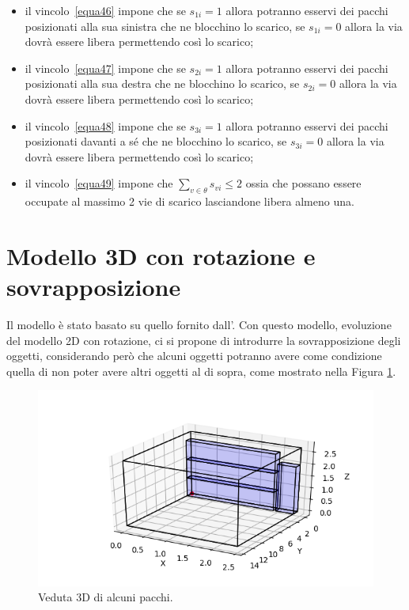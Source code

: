 \begin{itemize}
	\item il vincolo~\eqref{equa46} impone che se $s_{1i} = 1$ allora potranno esservi dei pacchi posizionati alla sua sinistra che ne blocchino lo scarico, se $s_{1i} = 0$ allora la via dovrà essere libera permettendo così lo scarico;
	\item il vincolo~\eqref{equa47} impone che se $s_{2i} = 1$ allora potranno esservi dei pacchi posizionati alla sua destra che ne blocchino lo scarico, se $s_{2i} = 0$ allora la via dovrà essere libera permettendo così lo scarico;
	\item il vincolo~\eqref{equa48} impone che se $s_{3i} = 1$ allora potranno esservi dei pacchi posizionati davanti a sé che ne blocchino lo scarico, se $s_{3i} = 0$ allora la via dovrà essere libera permettendo così lo scarico;
	\item il vincolo~\eqref{equa49} impone che $\sum_{v \in \theta} s_{vi} \leq 2$ ossia che possano essere occupate al massimo 2 vie di scarico lasciandone libera almeno una.
\end{itemize}

\newpage
\section{Modello 3D con rotazione e sovrapposizione}
Il modello è stato basato su quello fornito dall'.
Con questo modello, evoluzione del modello 2D con rotazione, ci si propone di introdurre la sovrapposizione degli oggetti, considerando però che alcuni oggetti potranno avere come condizione quella di non poter avere altri oggetti al di sopra, come mostrato nella Figura \ref{fig:3d_grafics}.

\begin{figure}[H]
	\begin{center} \includegraphics[scale=0.7]{figures/3d}
		\caption[Grafico con merci 3D]{Veduta 3D di alcuni pacchi.}
		\label{fig:3d_grafics}
	\end{center}
\end{figure}

